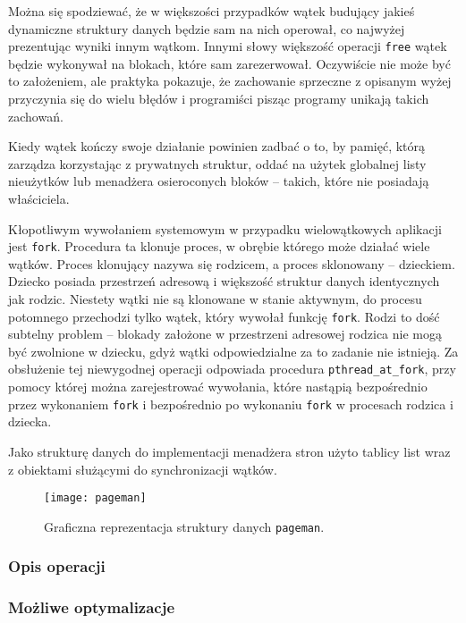 \documentclass[12pt,a4paper,titlepage,twoside]{mwart}
\begin{document}
Można się spodziewać, że w większości przypadków wątek budujący jakieś
dynamiczne struktury danych będzie sam na nich operował, co najwyżej
prezentując wyniki innym wątkom. Innymi słowy większość operacji \verb+free+
wątek będzie wykonywał na blokach, które sam zarezerwował. Oczywiście nie może
być to założeniem, ale praktyka pokazuje, że zachowanie sprzeczne z opisanym
wyżej przyczynia się do wielu błędów i programiści pisząc programy unikają
takich zachowań.

Kiedy wątek kończy swoje działanie powinien zadbać o to, by pamięć, którą
zarządza korzystając z prywatnych struktur, oddać na użytek globalnej listy
nieużytków lub menadżera osieroconych bloków -- takich, które nie posiadają
właściciela.

Kłopotliwym wywołaniem systemowym w przypadku wielowątkowych aplikacji jest
\texttt{fork}. Procedura ta klonuje proces, w obrębie którego może działać
wiele wątków. Proces klonujący nazywa się rodzicem, a proces sklonowany --
dzieckiem.  Dziecko posiada przestrzeń adresową i większość struktur danych
identycznych jak rodzic. Niestety wątki nie są klonowane w stanie aktywnym, do
procesu potomnego przechodzi tylko wątek, który wywołał funkcję \verb+fork+.
Rodzi to dość subtelny problem -- blokady założone w przestrzeni adresowej
rodzica nie mogą być zwolnione w dziecku, gdyż wątki odpowiedzialne za to
zadanie nie istnieją. Za obsłużenie tej niewygodnej operacji odpowiada
procedura \verb+pthread_at_fork+, przy pomocy której można zarejestrować
wywołania, które nastąpią bezpośrednio przez wykonaniem \verb+fork+ i
bezpośrednio po wykonaniu \verb+fork+ w procesach rodzica i dziecka.

Jako strukturę danych do implementacji menadżera stron użyto tablicy list wraz
z obiektami służącymi do synchronizacji wątków.

\begin{figure}[h]
\centering
\texttt{[image: pageman]}
\caption{Graficzna reprezentacja struktury danych \texttt{pageman}.}
\end{figure}

\subsubsection{Opis operacji}

\subsubsection{Możliwe optymalizacje}
\end{document}
